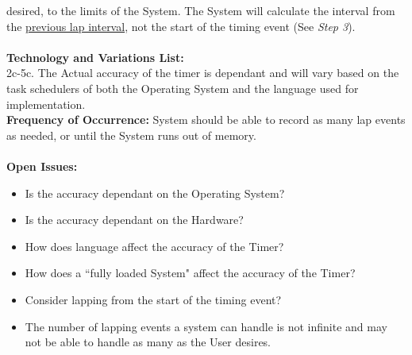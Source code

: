 \documentclass[letterpaper]{article}
\begin{document}
desired, to the limits of the System.  The System will calculate
the interval from the \underline{previous lap interval}, not the
start of the timing event (See \textit{Step 3}).\\\\
\textbf{Technology and Variations List:  }\\
2c-5c.  The Actual accuracy of the timer is dependant and
will vary based on the task schedulers of both the Operating
System and the language used for implementation.\\
\textbf{Frequency of Occurrence:  }System should be able to record
as many lap events as needed, or until the System runs out of 
memory.\\\\
\textbf{Open Issues:  }\\
\begin{itemize}
\item Is the accuracy dependant on the Operating System?
\item Is the accuracy dependant on the Hardware?
\item How does language affect the accuracy of the Timer?
\item How does a ``fully loaded System" affect the accuracy
of the Timer?
\item Consider lapping from the start of the timing event?
\item The number of lapping events a system can handle is not
infinite and may not be able to handle as many as the User desires.
\end{itemize}
\end{document}
